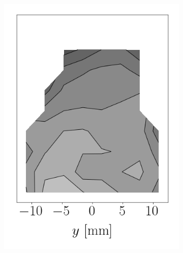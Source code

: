 \begin{figure}[h!]
\begin{subfigure}[b]{0.2\textwidth}
   \includegraphics[scale=0.4]{./part2_developments/figures_ch6_lagrangian_JICF/params_gaseous_initial_conditions/maps/prescribed_SMD}
\end{subfigure}
\hspace*{0.00in}
\begin{subfigure}[b]{0.2\textwidth}
	\flushleft

\end{subfigure}
\end{figure}

